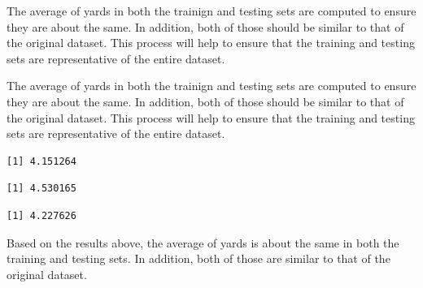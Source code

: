 \documentclass[
  super,
  preprint,
  3p]{elsarticle}
\newenvironment{Shaded}{\begin{snugshade}}{\end{snugshade}}
\newcommand{\CommentTok}[1]{\textcolor[rgb]{0.37,0.37,0.37}{#1}}
\newcommand{\FunctionTok}[1]{\textcolor[rgb]{0.28,0.35,0.67}{#1}}
\newcommand{\NormalTok}[1]{\textcolor[rgb]{0.00,0.23,0.31}{#1}}
\newcommand{\OtherTok}[1]{\textcolor[rgb]{0.00,0.23,0.31}{#1}}
\newcommand{\SpecialCharTok}[1]{\textcolor[rgb]{0.37,0.37,0.37}{#1}}
\begin{document}
The average of yards in both the trainign and testing sets are computed
to ensure they are about the same. In addition, both of those should be
similar to that of the original dataset. This process will help to
ensure that the training and testing sets are representative of the
entire dataset.

The average of yards in both the trainign and testing sets are computed
to ensure they are about the same. In addition, both of those should be
similar to that of the original dataset. This process will help to
ensure that the training and testing sets are representative of the
entire dataset.

\begin{Shaded}
\end{Shaded}

\begin{verbatim}
[1] 4.151264
\end{verbatim}

\begin{Shaded}
\end{Shaded}

\begin{verbatim}
[1] 4.530165
\end{verbatim}

\begin{Shaded}
\end{Shaded}

\begin{verbatim}
[1] 4.227626
\end{verbatim}

Based on the results above, the average of yards is about the same in
both the training and testing sets. In addition, both of those are
similar to that of the original dataset.
\end{document}
